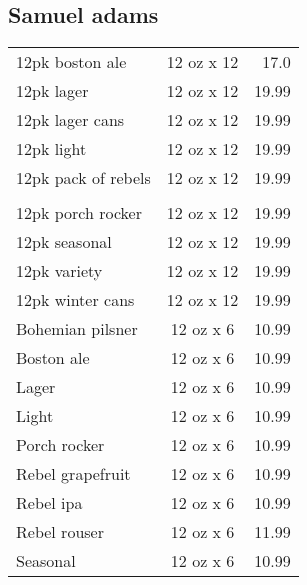 \documentclass{article}%
\begin{document}
\begin{multicols}{3}
%
\subsection*{Samuel adams}%
\begin{tabular}{l c r}%
12pk boston ale&12 oz x 12&17.0\\%
12pk lager&12 oz x 12&19.99\\%
12pk lager cans&12 oz x 12&19.99\\%
12pk light&12 oz x 12&19.99\\%
\multirow{1}{15ex}{12pk pack of rebels}&12 oz x 12&19.99\\%
&&\\%
12pk porch rocker&12 oz x 12&19.99\\%
12pk seasonal&12 oz x 12&19.99\\%
12pk variety&12 oz x 12&19.99\\%
12pk winter cans&12 oz x 12&19.99\\%
Bohemian pilsner&12 oz x 6&10.99\\%
Boston ale&12 oz x 6&10.99\\%
Lager&12 oz x 6&10.99\\%
Light&12 oz x 6&10.99\\%
Porch rocker&12 oz x 6&10.99\\%
Rebel grapefruit&12 oz x 6&10.99\\%
Rebel ipa&12 oz x 6&10.99\\%
Rebel rouser&12 oz x 6&11.99\\%
Seasonal&12 oz x 6&10.99\\%
\end{tabular}

%
\end{multicols}%
\end{document}
